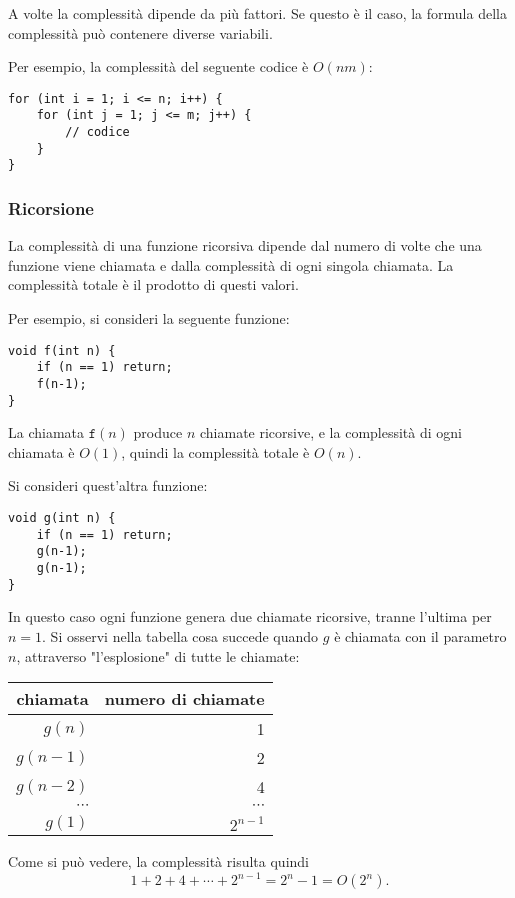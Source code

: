 A volte la complessità dipende da più fattori.
Se questo è il caso, la formula della complessità può contenere 
diverse variabili.

Per esempio, la complessità del seguente codice è $O(nm)$:

\begin{lstlisting}
for (int i = 1; i <= n; i++) {
    for (int j = 1; j <= m; j++) {
        // codice
    }
}
\end{lstlisting}

\subsubsection*{Ricorsione}

La complessità di una funzione ricorsiva dipende
dal numero di volte che una funzione viene chiamata
e dalla complessità di ogni singola chiamata.
La complessità totale è il prodotto di questi valori.

Per esempio, si consideri la seguente funzione:

\begin{lstlisting}
void f(int n) {
    if (n == 1) return;
    f(n-1);
}
\end{lstlisting}
La chiamata $\texttt{f}(n)$ produce $n$ chiamate ricorsive,
e la complessità di ogni chiamata è $O(1)$, quindi la complessità totale è $O(n)$.

Si consideri quest'altra funzione: 

\begin{lstlisting}
void g(int n) {
    if (n == 1) return;
    g(n-1);
    g(n-1);
}
\end{lstlisting}
In questo caso ogni funzione genera due chiamate ricorsive, tranne
l'ultima per $n=1$.
Si osservi nella tabella cosa succede quando $g$ è chiamata con
il parametro $n$, attraverso "l'esplosione" di tutte le chiamate:
\begin{center}
\begin{tabular}{rr}
chiamata & numero di chiamate \\
\hline
$g(n)$ & 1 \\
$g(n-1)$ & 2 \\
$g(n-2)$ & 4 \\
$\cdots$ & $\cdots$ \\
$g(1)$ & $2^{n-1}$ \\
\end{tabular}
\end{center}
Come si può vedere, la complessità risulta quindi
\[1+2+4+\cdots+2^{n-1} = 2^n-1 = O(2^n).\]

